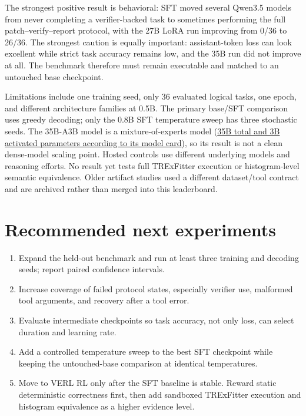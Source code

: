 \documentclass[11pt]{article}
\begin{document}
The strongest positive result is behavioral: SFT moved several Qwen3.5 models
from never completing a verifier-backed task to sometimes performing the full
patch--verify--report protocol, with the 27B LoRA run improving from 0/36 to
26/36.  The strongest caution is equally important: assistant-token loss can
look excellent while strict task accuracy remains low, and the 35B run did not
improve at all.  The benchmark therefore must remain executable and matched to
an untouched base checkpoint.

Limitations include one training seed, only 36 evaluated logical tasks, one
epoch, and different architecture families at 0.5B.  The primary base/SFT
comparison uses greedy decoding; only the 0.8B SFT temperature sweep has three
stochastic seeds.  The
35B-A3B model is a mixture-of-experts model
(\href{https://huggingface.co/Qwen/Qwen3.5-35B-A3B}{35B total and 3B activated
parameters according to its model card}), so its result is not a clean
dense-model scaling point.  Hosted controls use different underlying models
and reasoning efforts.  No result yet tests full TRExFitter execution or histogram-level
semantic equivalence.  Older artifact studies used a different dataset/tool
contract and are archived rather than merged into this leaderboard.

\section{Recommended next experiments}

\begin{enumerate}
  \item Expand the held-out benchmark and run at least three training and
  decoding seeds; report paired confidence intervals.
  \item Increase coverage of failed protocol states, especially verifier use,
  malformed tool arguments, and recovery after a tool error.
  \item Evaluate intermediate checkpoints so task accuracy, not only loss, can
  select duration and learning rate.
  \item Add a controlled temperature sweep to the best SFT checkpoint while
  keeping the untouched-base comparison at identical temperatures.
  \item Move to VERL RL only after the SFT baseline is stable.  Reward static
  deterministic correctness first, then add sandboxed TRExFitter execution and
  histogram equivalence as a higher evidence level.
\end{enumerate}
\end{document}
